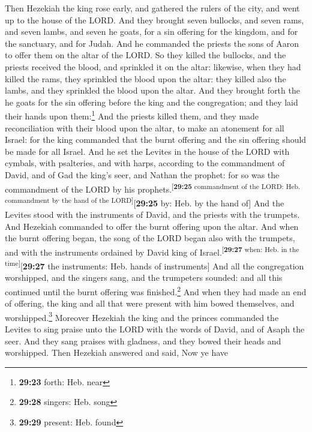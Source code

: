  Then Hezekiah the king rose early, and gathered the
rulers of the city, and went up to the house of the LORD.
 And they brought seven bullocks, and seven rams, and
seven lambs, and seven he goats, for a sin offering for the kingdom, and
for the sanctuary, and for Judah. And he commanded the priests the sons
of Aaron to offer them on the altar of the LORD.  So they
killed the bullocks, and the priests received the blood, and sprinkled
it on the altar: likewise, when they had killed the rams, they sprinkled
the blood upon the altar: they killed also the lambs, and they sprinkled
the blood upon the altar.  And they brought forth the he
goats for the sin offering before the king and the congregation; and
they laid their hands upon them:\footnote{\textbf{29:23} forth: Heb.
  near}  And the priests killed them, and they made
reconciliation with their blood upon the altar, to make an atonement for
all Israel: for the king commanded that the burnt offering and the sin
offering should be made for all Israel.  And he set the
Levites in the house of the LORD with cymbals, with psalteries, and with
harps, according to the commandment of David, and of Gad the king's
seer, and Nathan the prophet: for so was the commandment of the LORD by
his prophets.\textsuperscript{{[}\textbf{29:25} commandment of the LORD:
Heb. commandment by the hand of the LORD{]}}{[}\textbf{29:25} by: Heb.
by the hand of{]}  And the Levites stood with the
instruments of David, and the priests with the trumpets. 
And Hezekiah commanded to offer the burnt offering upon the altar. And
when the burnt offering began, the song of the LORD began also with the
trumpets, and with the instruments ordained by David king of
Israel.\textsuperscript{{[}\textbf{29:27} when: Heb. in the
time{]}}{[}\textbf{29:27} the instruments: Heb. hands of instruments{]}
 And all the congregation worshipped, and the singers
sang, and the trumpeters sounded: and all this continued until the burnt
offering was finished.\footnote{\textbf{29:28} singers: Heb. song}
 And when they had made an end of offering, the king and
all that were present with him bowed themselves, and
worshipped.\footnote{\textbf{29:29} present: Heb. found} 
Moreover Hezekiah the king and the princes commanded the Levites to sing
praise unto the LORD with the words of David, and of Asaph the seer. And
they sang praises with gladness, and they bowed their heads and
worshipped.  Then Hezekiah answered and said, Now ye have
